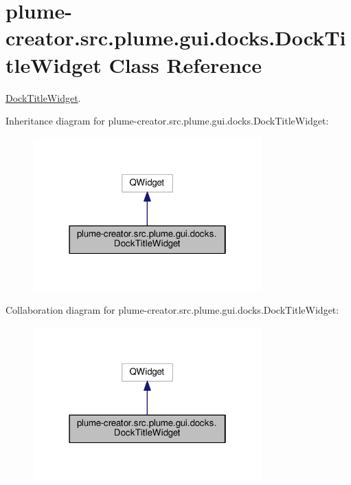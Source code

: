 \hypertarget{classplume-creator_1_1src_1_1plume_1_1gui_1_1docks_1_1_dock_title_widget}{}\section{plume-\/creator.src.\+plume.\+gui.\+docks.\+Dock\+Title\+Widget Class Reference}
\label{classplume-creator_1_1src_1_1plume_1_1gui_1_1docks_1_1_dock_title_widget}


\hyperlink{classplume-creator_1_1src_1_1plume_1_1gui_1_1docks_1_1_dock_title_widget}{Dock\+Title\+Widget}.  




Inheritance diagram for plume-\/creator.src.\+plume.\+gui.\+docks.\+Dock\+Title\+Widget\+:\nopagebreak
\begin{figure}[H]
\begin{center}
\leavevmode
\includegraphics[width=250pt]{classplume-creator_1_1src_1_1plume_1_1gui_1_1docks_1_1_dock_title_widget__inherit__graph}
\end{center}
\end{figure}


Collaboration diagram for plume-\/creator.src.\+plume.\+gui.\+docks.\+Dock\+Title\+Widget\+:\nopagebreak
\begin{figure}[H]
\begin{center}
\leavevmode
\includegraphics[width=250pt]{classplume-creator_1_1src_1_1plume_1_1gui_1_1docks_1_1_dock_title_widget__coll__graph}
\end{center}
\end{figure}
